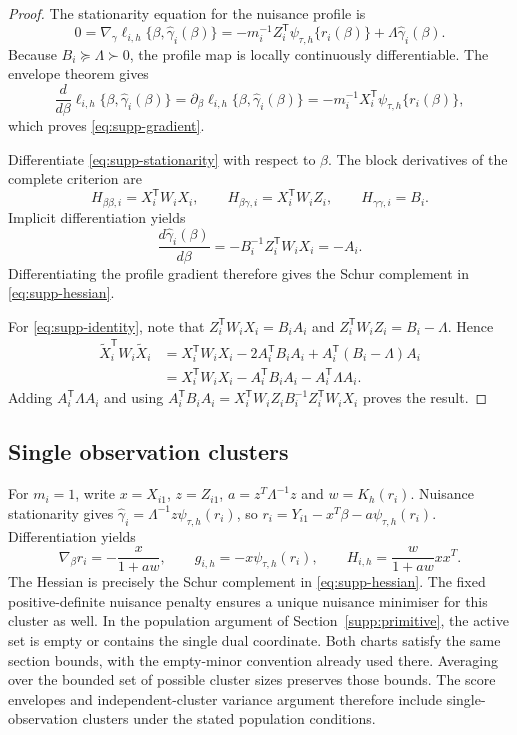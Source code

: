 \begin{proof}
The stationarity equation for the nuisance profile is
\begin{equation}\label{eq:supp-stationarity}
 0=\nabla_{\gamma}\ell_{i,h}\{\beta,\widehat\gamma_i(\beta)\}
 =-m_i^{-1}Z_i^{\mathsf T}\psi_{\tau,h}\{r_i(\beta)\}
 +\Lambda\widehat\gamma_i(\beta).
\end{equation}
Because $B_i\succeq\Lambda\succ0$, the profile map is locally continuously differentiable. The envelope theorem gives
\[
 \frac{d}{d\beta}\ell_{i,h}\{\beta,\widehat\gamma_i(\beta)\}
 =\partial_{\beta}\ell_{i,h}\{\beta,\widehat\gamma_i(\beta)\}
 =-m_i^{-1}X_i^{\mathsf T}\psi_{\tau,h}\{r_i(\beta)\},
\]
which proves \eqref{eq:supp-gradient}.

Differentiate \eqref{eq:supp-stationarity} with respect to $\beta$. The block derivatives of the complete criterion are
\[
 H_{\beta\beta,i}=X_i^{\mathsf T}W_iX_i,
 \qquad H_{\beta\gamma,i}=X_i^{\mathsf T}W_iZ_i,
 \qquad H_{\gamma\gamma,i}=B_i.
\]
Implicit differentiation yields
\[
 \frac{d\widehat\gamma_i(\beta)}{d\beta}
 =-B_i^{-1}Z_i^{\mathsf T}W_iX_i=-A_i.
\]
Differentiating the profile gradient therefore gives the Schur complement in \eqref{eq:supp-hessian}.

For \eqref{eq:supp-identity}, note that $Z_i^{\mathsf T}W_iX_i=B_iA_i$ and $Z_i^{\mathsf T}W_iZ_i=B_i-\Lambda$. Hence
\begin{align*}
 \widetilde X_i^{\mathsf T}W_i\widetilde X_i
 &=X_i^{\mathsf T}W_iX_i-2A_i^{\mathsf T}B_iA_i
 +A_i^{\mathsf T}(B_i-\Lambda)A_i\\
 &=X_i^{\mathsf T}W_iX_i-A_i^{\mathsf T}B_iA_i-A_i^{\mathsf T}\Lambda A_i.
\end{align*}
Adding $A_i^{\mathsf T}\Lambda A_i$ and using
$A_i^{\mathsf T}B_iA_i=X_i^{\mathsf T}W_iZ_iB_i^{-1}Z_i^{\mathsf T}W_iX_i$
proves the result.
\end{proof}

\subsection{Single observation clusters}

For $m_i=1$, write $x=X_{i1}$, $z=Z_{i1}$,
$a=z^T\Lambda^{-1}z$ and $w=K_h(r_i)$. Nuisance stationarity gives
$\widehat\gamma_i=\Lambda^{-1}z\psi_{\tau,h}(r_i)$, so
$r_i=Y_{i1}-x^T\beta-a\psi_{\tau,h}(r_i)$. Differentiation yields
\[
 \nabla_\beta r_i=-\frac{x}{1+aw},\qquad
 g_{i,h}=-x\psi_{\tau,h}(r_i),\qquad
 H_{i,h}=\frac{w}{1+aw}xx^T.
\]
The Hessian is precisely the Schur complement in
\eqref{eq:supp-hessian}. The fixed positive-definite nuisance penalty
ensures a unique nuisance minimiser for this cluster as well.
In the population argument of Section~\ref{supp:primitive}, the
active set is empty or contains the single dual coordinate. Both
charts satisfy the same section bounds, with the empty-minor
convention already used there. Averaging over the bounded set of
possible cluster sizes preserves those bounds. The score envelopes
and independent-cluster variance argument therefore include
single-observation clusters under the stated population conditions.

